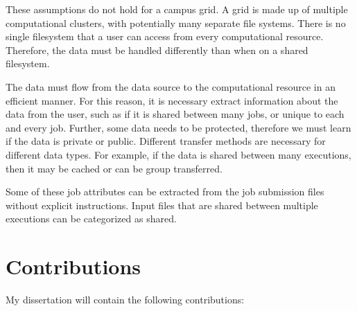 These assumptions do not hold for a campus grid.  A grid is made up of multiple computational clusters, with potentially many separate file systems.  There is no single filesystem that a user can access from every computational resource.  Therefore, the data must be handled differently than when on a shared filesystem.  

The data must flow from the data source to the computational resource in an efficient manner.  For this reason, it is necessary extract information about the data from the user, such as if it is shared between many jobs, or unique to each and every job.  Further, some data needs to be protected, therefore we must learn if the data is private or public.  Different transfer methods are necessary for different data types.  For example, if the data is shared between many executions, then it may be cached or can be group transferred.  

Some of these job attributes can be extracted from the job submission files without explicit instructions.  Input files that are shared between multiple executions can be categorized as shared.

\section{Contributions}

My dissertation will contain the following contributions:

